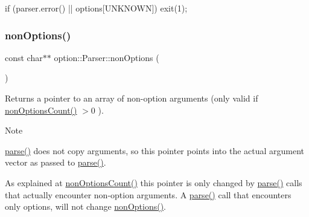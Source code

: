 \begin{DoxyCode}
\textcolor{keywordflow}{if} (parser.error() || options[UNKNOWN])
  exit(1);
\end{DoxyCode}
 \mbox{\label{classoption_1_1Parser_a2c11b050f4248d71758dda52c5f9154d}} 
\subsubsection{\texorpdfstring{non\+Options()}{nonOptions()}}
{\footnotesize\ttfamily const char$\ast$$\ast$ option\+::\+Parser\+::non\+Options (\begin{DoxyParamCaption}{ }\end{DoxyParamCaption})\hspace{0.3cm}{\ttfamily [inline]}}



Returns a pointer to an array of non-\/option arguments (only valid if {\ttfamily \hyperlink{classoption_1_1Parser_aa64a6a7c196993a1b20d48e8ddd12a34}{non\+Options\+Count()} $>$0 }). 

\begin{DoxyNote}{Note}
\begin{DoxyItemize}
\item \hyperlink{classoption_1_1Parser_a6e0b5778d1cfbd6cd51240e74d01e138}{parse()} does not copy arguments, so this pointer points into the actual argument vector as passed to \hyperlink{classoption_1_1Parser_a6e0b5778d1cfbd6cd51240e74d01e138}{parse()}. \item As explained at \hyperlink{classoption_1_1Parser_aa64a6a7c196993a1b20d48e8ddd12a34}{non\+Options\+Count()} this pointer is only changed by \hyperlink{classoption_1_1Parser_a6e0b5778d1cfbd6cd51240e74d01e138}{parse()} calls that actually encounter non-\/option arguments. A \hyperlink{classoption_1_1Parser_a6e0b5778d1cfbd6cd51240e74d01e138}{parse()} call that encounters only options, will not change \hyperlink{classoption_1_1Parser_a2c11b050f4248d71758dda52c5f9154d}{non\+Options()}. \end{DoxyItemize}

\end{DoxyNote}
\mbox{\label{classoption_1_1Parser_aa64a6a7c196993a1b20d48e8ddd12a34}} 
